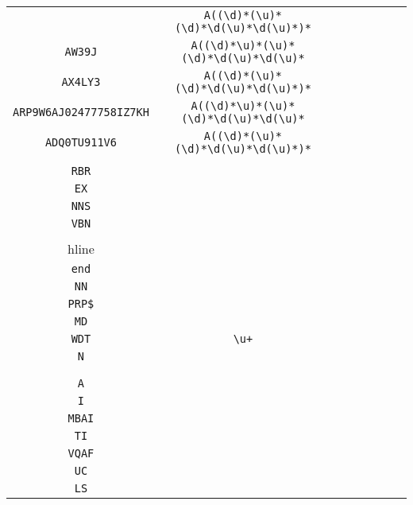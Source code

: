 \begin{longtable}{cccccccc}
\begin{tabular}{ll}
    \verb|A| & \verb|A((\d)*(\u)*(\d)*\d(\u)*\d(\u)*)*|\\
\verb|AW39J| & \verb|A((\d)*\u)*(\u)*(\d)*\d(\u)*\d(\u)*|\\
\verb|AX4LY3| & \verb|A((\d)*(\u)*(\d)*\d(\u)*\d(\u)*)*|\\
\verb|ARP9W6AJ02477758IZ7KH| & \verb|A((\d)*\u)*(\u)*(\d)*\d(\u)*\d(\u)*|\\
\verb|ADQ0TU911V6| & \verb|A((\d)*(\u)*(\d)*\d(\u)*\d(\u)*)*|
\end{tabular}
\\\midrule 
\begin{tabular}{l}
    \verb|JJ|\\
\verb|RBR|\\
\verb|EX|\\
\verb|NNS|\\
\verb|VBN|\\
\\hline\\
\verb|end|\\
\verb|NN|\\
\verb|PRP$|\\
\verb|MD|\\
\verb|WDT|
\end{tabular}

&
\verb|\u+|
&

\begin{tabular}{l}
    \verb|(\u)*|\\
\verb|N|\\
\verb||\\
\verb||\\
\verb|A|\\
\verb|I|
\end{tabular}

&

\begin{tabular}{l}
    \verb|(\u)*\u\u|\\
\verb|MBAI|\\
\verb|TI|\\
\verb|VQAF|\\
\verb|UC|\\
\verb|LS|
\end{tabular}

&


\end{longtable}
